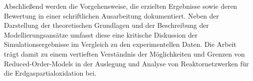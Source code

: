 Abschließend werden die Vorgehensweise, die erzielten Ergebnisse sowie deren Bewertung in einer schriftlichen Ausarbeitung dokumentiert. Neben der Darstellung der theoretischen Grundlagen und der Beschreibung der Modellierungsansätze umfasst diese eine kritische Diskussion der Simulationsergebnisse im Vergleich zu den experimentellen Daten. Die Arbeit trägt damit zu einem vertieften Verständnis der Möglichkeiten und Grenzen von Reduced-Order-Models in der Auslegung und Analyse von Reaktornetzwerken für die Erdgaspartialoxidation bei.
